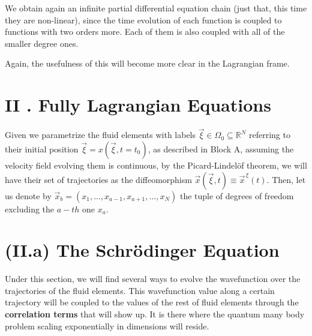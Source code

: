 \documentclass[11pt, a4paper]{article} %
\newcommand{\R}{\mathbb{R}} %
\begin{document}
We obtain again an infinite partial differential equation chain (just that, this time they are non-linear), since the time evolution of each function is coupled to functions with two orders more. Each of them is also coupled with all of the smaller degree ones.

Again, the usefulness of this will become more clear in the Lagrangian frame.

\newpage
{}
\section*{II . Fully Lagrangian Equations}
Given we parametrize the fluid elements with labels $\vec{\xi}\in\Omega_0\subseteq\R^N$ referring to their initial position $\vec{\xi}=x(\vec{\xi},t=t_0)$, as described in Block A, assuming the velocity field evolving them is continuous, by the Picard-Lindelöf theorem, we will have their set of trajectories as the diffeomorphism $\vec{x}(\vec{\xi},t) \equiv \vec{x}^{\, \xi}(t)$.
Then, let us denote by $\vec{x}_b=(x_1,...,x_{a-1}, x_{a+1},...,x_N)$ the tuple of degrees of freedom excluding the $a-th$ one $x_a$.\vspace{-0.3cm}
\section*{(II.a) The Schrödinger Equation\vspace{-0.3cm}}
Under this section, we will find several ways to evolve the wavefunction over the trajectories of the fluid elements. This wavefunction value along a certain trajectory will be coupled to the values of the rest of fluid elements through the {\bf correlation terms} that will show up. It is there where the quantum many body problem scaling exponentially in dimensions will reside.\vspace{-0.3cm}
\end{document}

